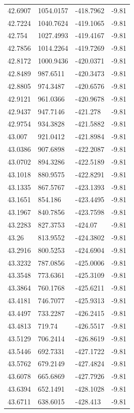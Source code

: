 \begin{table}[H]
\begin{tabular}{llll}
42.6907 & 1054.0157 & -418.7962 & -9.81 \\
42.7224 & 1040.7624 & -419.1065 & -9.81 \\
42.754 & 1027.4993 & -419.4167 & -9.81 \\
42.7856 & 1014.2264 & -419.7269 & -9.81 \\
42.8172 & 1000.9436 & -420.0371 & -9.81 \\
42.8489 & 987.6511 & -420.3473 & -9.81 \\
42.8805 & 974.3487 & -420.6576 & -9.81 \\
42.9121 & 961.0366 & -420.9678 & -9.81 \\
42.9437 & 947.7146 & -421.278 & -9.81 \\
42.9754 & 934.3828 & -421.5882 & -9.81 \\
43.007 & 921.0412 & -421.8984 & -9.81 \\
43.0386 & 907.6898 & -422.2087 & -9.81 \\
43.0702 & 894.3286 & -422.5189 & -9.81 \\
43.1018 & 880.9575 & -422.8291 & -9.81 \\
43.1335 & 867.5767 & -423.1393 & -9.81 \\
43.1651 & 854.186 & -423.4495 & -9.81 \\
43.1967 & 840.7856 & -423.7598 & -9.81 \\
43.2283 & 827.3753 & -424.07 & -9.81 \\
43.26 & 813.9552 & -424.3802 & -9.81 \\
43.2916 & 800.5253 & -424.6904 & -9.81 \\
43.3232 & 787.0856 & -425.0006 & -9.81 \\
43.3548 & 773.6361 & -425.3109 & -9.81 \\
43.3864 & 760.1768 & -425.6211 & -9.81 \\
43.4181 & 746.7077 & -425.9313 & -9.81 \\
43.4497 & 733.2287 & -426.2415 & -9.81 \\
43.4813 & 719.74 & -426.5517 & -9.81 \\
43.5129 & 706.2414 & -426.8619 & -9.81 \\
43.5446 & 692.7331 & -427.1722 & -9.81 \\
43.5762 & 679.2149 & -427.4824 & -9.81 \\
43.6078 & 665.6869 & -427.7926 & -9.81 \\
43.6394 & 652.1491 & -428.1028 & -9.81 \\
43.6711 & 638.6015 & -428.413 & -9.81 \\

\end{tabular}
\end{table}
